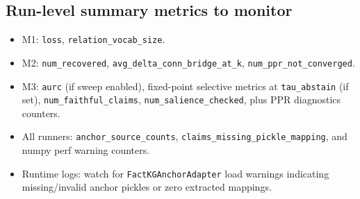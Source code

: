 \subsection{Run-level summary metrics to monitor}
\begin{itemize}
\item M1: \texttt{loss}, \texttt{relation\_vocab\_size}.
\item M2: \texttt{num\_recovered}, \texttt{avg\_delta\_conn\_bridge\_at\_k}, \texttt{num\_ppr\_not\_converged}.
\item M3: \texttt{aurc} (if sweep enabled), fixed-point selective metrics at \texttt{tau\_abstain} (if set), \texttt{num\_faithful\_claims}, \texttt{num\_salience\_checked}, plus PPR diagnostics counters.
\item All runners: \texttt{anchor\_source\_counts}, \texttt{claims\_missing\_pickle\_mapping}, and numpy perf warning counters.
\item Runtime logs: watch for \texttt{FactKGAnchorAdapter} load warnings indicating missing/invalid anchor pickles or zero extracted mappings.
\end{itemize}
